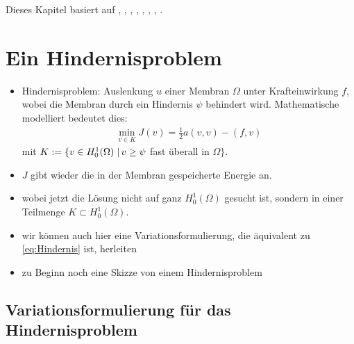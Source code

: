 
Dieses Kapitel basiert auf \cite{KikOden}, \cite{StarkeVar}, \cite{EPS}, \cite{EPSContact}, \cite{WriggersFEM}, \cite{HlaHas}, \cite{Glow}, \cite{Falk}.

\section{Ein Hindernisproblem}

\begin{itemize}
\item Hindernisproblem: Auslenkung $u$ einer Membran $\Omega$ unter Krafteinwirkung $f$, wobei die Membran durch ein Hindernis $\psi$ behindert wird. Mathematische modelliert bedeutet dies:
\begin{align}\label{eq:Hindernis}
\min_{v\in K} J(v) = \frac 1 2 a(v,v)-(f,v)
\end{align}
mit $K := \{v \in H^1_0(\Omega) \;\vert\, v\ge \psi$ fast überall in $\Omega\}$. 

\item $J$ gibt wieder die in der Membran gespeicherte Energie an.
\item wobei jetzt die Lösung nicht auf ganz $H^1_0(\Omega)$ gesucht ist, sondern in einer Teilmenge $K \subset H^1_0(\Omega)$.

\item wir können auch hier eine Variationsformulierung, die äquivalent zu \eqref{eq:Hindernis} ist, herleiten

\item zu Beginn noch eine Skizze von einem Hindernisproblem

\end{itemize}



\subsection{Variationsformulierung für das Hindernisproblem}

